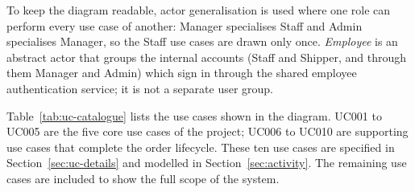 To keep the diagram readable, actor generalisation is used where one role can perform every use case of another: Manager specialises Staff and Admin specialises Manager, so the Staff use cases are drawn only once. \textit{Employee} is an abstract actor that groups the internal accounts (Staff and Shipper, and through them Manager and Admin) which sign in through the shared employee authentication service; it is not a separate user group.

Table~\ref{tab:uc-catalogue} lists the use cases shown in the diagram. UC001 to UC005 are the five core use cases of the project; UC006 to UC010 are supporting use cases that complete the order lifecycle. These ten use cases are specified in Section~\ref{sec:uc-details} and modelled in Section~\ref{sec:activity}. The remaining use cases are included to show the full scope of the system.

